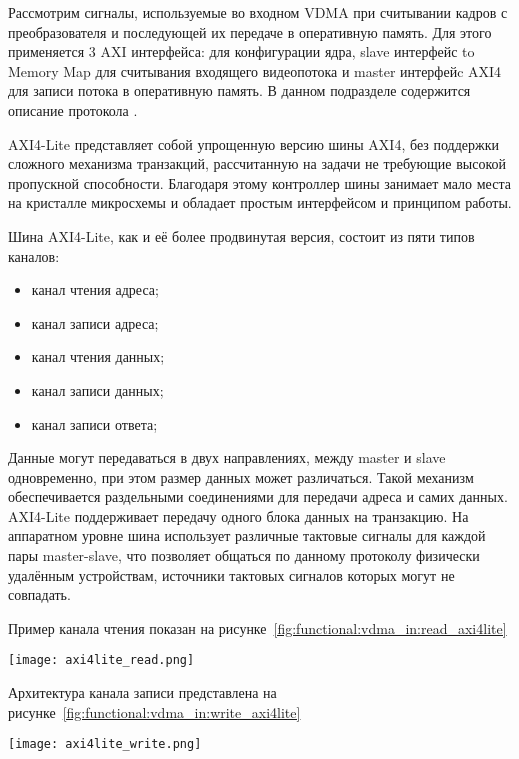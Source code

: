 Рассмотрим сигналы, используемые во входном VDMA при считывании кадров с преобразователя и последующей их передаче
в оперативную память. Для этого применяется 3 AXI интерфейса:  для конфигурации ядра,
slave интерфейс  to Memory Map для считывания входящего видеопотока и master интерфейc AXI4
для записи потока в оперативную память. В данном подразделе содержится описание протокола .


AXI4-Lite представляет собой упрощенную версию шины AXI4, без поддержки сложного механизма транзакций,
рассчитанную на задачи не требующие высокой пропускной способности. Благодаря этому контроллер шины
занимает мало места на кристалле микросхемы и обладает простым интерфейсом и принципом работы.

Шина AXI4-Lite, как и её более продвинутая версия, состоит из пяти типов каналов:

\begin{itemize}
  \item канал чтения адреса;
  \item канал записи адреса;
  \item канал чтения данных;
  \item канал записи данных;
  \item канал записи ответа;
\end{itemize}

Данные могут передаваться в двух направлениях, между master и slave одновременно,
при этом размер данных может различаться. Такой механизм обеспечивается раздельными соединениями
для передачи адреса и самих данных. AXI4-Lite поддерживает передачу одного блока данных на транзакцию.
На аппаратном уровне шина использует различные тактовые сигналы для каждой пары master-slave,
что позволяет общаться по данному протоколу физически удалённым устройствам, источники
тактовых сигналов которых могут не совпадать. %

Пример канала чтения показан на рисунке~\ref{fig:functional:vdma_in:read_axi4lite}

\begin{center}
  \centering
  \texttt{[image: axi4lite\_read.png]}
  \label{fig:functional:vdma_in:read_axi4lite}
\end{center}

Архитектура канала записи представлена на рисунке~\ref{fig:functional:vdma_in:write_axi4lite}

\begin{center}
  \centering
  \texttt{[image: axi4lite\_write.png]}
  \label{fig:functional:vdma_in:write_axi4lite}
\end{center}

